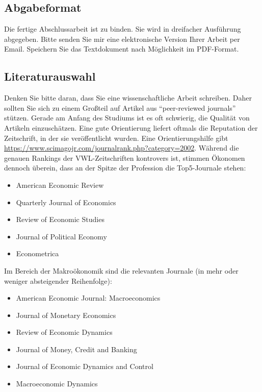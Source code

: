 \documentclass[a4paper,12pt]{scrartcl} %
\begin{document}
\subsection{Abgabeformat}
Die fertige Abschlussarbeit ist zu binden. Sie wird in dreifacher Ausführung abgegeben. Bitte senden Sie mir eine elektronische Version Ihrer Arbeit per Email. Speichern Sie das Textdokument nach Möglichkeit im PDF-Format. %

\subsection{Literaturauswahl}

Denken Sie bitte daran, dass Sie eine wissenschaftliche Arbeit schreiben. Daher sollten Sie sich zu einem Großteil auf Artikel aus ``peer-reviewed journals'' stützen. Gerade am Anfang des Studiums ist es oft schwierig, die Qualität von Artikeln einzuschätzen. Eine gute Orientierung liefert oftmals die Reputation der Zeitschrift, in der sie veröffentlicht wurden. Eine Orientierungshilfe gibt \url{https://www.scimagojr.com/journalrank.php?category=2002}. Während die genauen Rankings der VWL-Zeitschriften kontrovers ist, stimmen Ökonomen dennoch überein, dass an der Spitze der Profession die Top5-Journale stehen:
\begin{itemize}
  \item American Economic Review
  \item Quarterly Journal of Economics
  \item Review of Economic Studies
  \item Journal of Political Economy
  \item Econometrica
\end{itemize}

Im Bereich der Makroökonomik sind die relevanten Journale (in mehr oder weniger absteigender Reihenfolge):
\begin{itemize}
  \item American Economic Journal: Macroeconomics
  \item Journal of Monetary Economics
  \item Review of Economic Dynamics
  \item Journal of Money, Credit and Banking
  \item Journal of Economic Dynamics and Control
  \item Macroeconomic Dynamics
\end{itemize}
\end{document}
